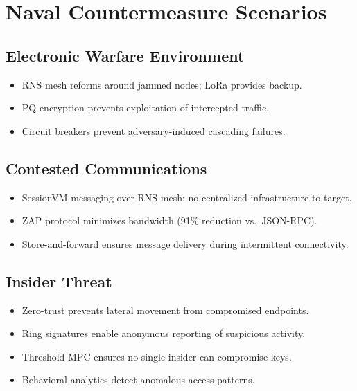 \documentclass[11pt,letterpaper]{article}
\begin{document}
\section{Naval Countermeasure Scenarios}

\subsection{Electronic Warfare Environment}

\begin{itemize}
\item RNS mesh reforms around jammed nodes; LoRa provides backup.
\item PQ encryption prevents exploitation of intercepted traffic.
\item Circuit breakers prevent adversary-induced cascading failures.
\end{itemize}

\subsection{Contested Communications}

\begin{itemize}
\item SessionVM messaging over RNS mesh: no centralized infrastructure to target.
\item ZAP protocol minimizes bandwidth (91\% reduction vs.\ JSON-RPC).
\item Store-and-forward ensures message delivery during intermittent connectivity.
\end{itemize}

\subsection{Insider Threat}

\begin{itemize}
\item Zero-trust prevents lateral movement from compromised endpoints.
\item Ring signatures enable anonymous reporting of suspicious activity.
\item Threshold MPC ensures no single insider can compromise keys.
\item Behavioral analytics detect anomalous access patterns.
\end{itemize}
\end{document}
